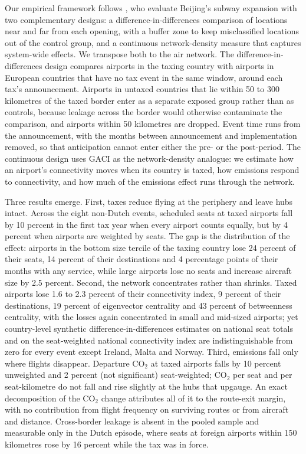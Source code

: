 Our empirical framework follows \citet{li2019subway}, who evaluate Beijing's subway expansion with two
complementary designs: a difference-in-differences comparison of locations near and far from each
opening, with a buffer zone to keep misclassified locations out of the control group, and a continuous
network-density measure that captures system-wide effects. We transpose both to the air network. The
difference-in-differences design compares airports in the taxing country with airports in European
countries that have no tax event in the same window, around each tax's announcement. Airports in
untaxed countries that lie within 50 to 300 kilometres of the taxed border enter as a separate exposed
group rather than as controls, because leakage across the border would otherwise contaminate the
comparison, and airports within 50 kilometres are dropped. Event time runs from the announcement, with
the months between announcement and implementation removed, so that anticipation cannot enter either
the pre- or the post-period. The continuous design uses GACI as the network-density analogue: we
estimate how an airport's connectivity moves when its country is taxed, how emissions respond to
connectivity, and how much of the emissions effect runs through the network.

Three results emerge. First, taxes reduce flying at the periphery and leave hubs intact. Across the
eight non-Dutch events, scheduled seats at taxed airports fall by 10 percent in the first tax year when
every airport counts equally, but by 4 percent when airports are weighted by seats. The gap is the
distribution of the effect: airports in the bottom size tercile of the taxing country lose 24 percent of
their seats, 14 percent of their destinations and 4 percentage points of their months with any service,
while large airports lose no seats and increase aircraft size by 2.5 percent. Second, the network
concentrates rather than shrinks. Taxed airports lose 1.6 to 2.3 percent of their connectivity index, 9
percent of their destinations, 19 percent of eigenvector centrality and 43 percent of betweenness
centrality, with the losses again concentrated in small and mid-sized airports; yet country-level
synthetic difference-in-differences estimates on national seat totals and on the seat-weighted national
connectivity index are indistinguishable from zero for every event except Ireland, Malta and Norway.
Third, emissions fall only where flights disappear. Departure CO$_2$ at taxed airports falls by 10
percent unweighted and 2 percent (not significant) seat-weighted; CO$_2$ per seat and per seat-kilometre
do not fall and rise slightly at the hubs that upgauge. An exact decomposition of the CO$_2$ change
attributes all of it to the route-exit margin, with no contribution from flight frequency on surviving
routes or from aircraft and distance. Cross-border leakage is absent in the pooled sample and
measurable only in the Dutch episode, where seats at foreign airports within 150 kilometres rose by 16
percent while the tax was in force.

